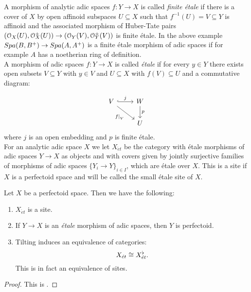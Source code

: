 A morphism of analytic adic spaces $f\colon Y\to X$ is called \emph{finite \'etale} if there is a cover of $X$ by open affinoid subspaces
$U\subseteq X$ such that $f^{-1}(U)=V\subseteq Y$ is affinoid and the associated morphism of Huber-Tate pairs
$(\Oo_X(U), \Oo\upplus\!\!\!\!_X(U))\to(\Oo_Y(V), \Oo\upplus\!\!\!\!_Y(V))$ is finite \'etale. 
In the above example ${Spa({B},{B{^{+}}})}\to{Spa({A},{A{^{+}}})}$ is a finite \'etale morphism of adic spaces if for example $A$ has a noetherian ring of definition.\\



A morphism of adic spaces $f\colon Y\to X$ is called \emph{\'etale} if for every $y\in Y$ there exists open subsets $V\subseteq Y$ with $y\in V$ 
and $U\subseteq X$ with $f(V)\subseteq U$ and a commutative diagram:

\[
\begin{tikzcd}
V \arrow[rd, swap,  "\restr{f}{V}"] \arrow[r,"j", hook] & W \arrow[d, "p"] \\
& U
\end{tikzcd}
\]
where $j$ is an open embedding and $p$ is finite \'etale.\\


For an analytic adic space $X$ we let $X_{\acute{e}t}$ be the category with \'{e}tale morphisms of adic spaces $Y\to X$  as objects and with covers given by 
jointly surjective families of morphisms of adic spaces $\{Y_i\to Y\}_{i\in I}$, which are \'etale over $X$. This is a site if $X$ is a perfectoid space and will be called the small \'etale site of $X$.



\begin{theorem}\label{almostpuritythm}
Let $X$ be a perfectoid space. Then we have the following:
\begin{enumerate}
\item $X_{\acute{e}t}$ is a site.
\item If $Y\to X$ is  an \emph{\'etale} morphism of adic spaces, then $Y$ is perfectoid.
\item Tilting induces an equivalence of categories:
\[X_{\acute{e}t}\cong X^{\flat}_{\acute{e}t}.\]
This is in fact an equivalence of sites.
\end{enumerate}
\end{theorem}
\begin{proof}
This is \cite[theorem 7.9]{Scholze12}.
\end{proof}


